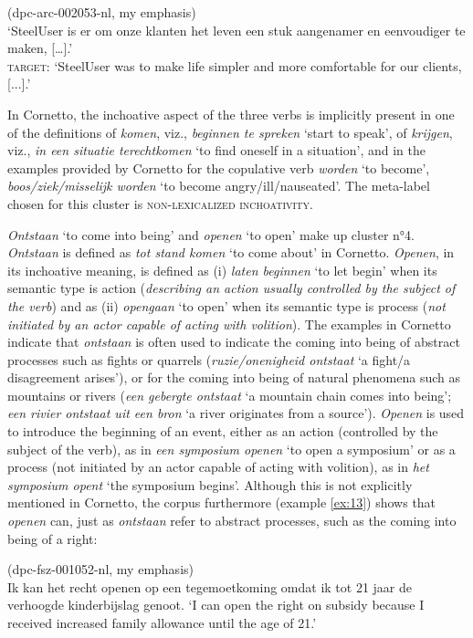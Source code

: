 \ea\label{ex:12}(dpc-arc-002053-nl, my emphasis)\\
`SteelUser is er  om onze klanten het leven een stuk aangenamer en eenvoudiger te maken, […].'\smallskip\\\relax
\textsc{target}: `SteelUser was  to make life simpler and more comfortable for our clients, [...].'
\z

In Cornetto, the inchoative aspect of the three verbs is implicitly present in one of the definitions of \textit{komen}, viz., \textit{beginnen te spreken} `start to speak', of \textit{krijgen}, viz., \textit{in een situatie terechtkomen} `to find oneself in a situation', and in the examples provided by Cornetto for the copulative verb \textit{worden} `to become', \textit{boos\slash ziek\slash misselijk worden} `to become angry\slash ill\slash nauseated'. The meta-label chosen for this cluster is \textsc{non-lexicalized inchoativity}.

\textit{Ontstaan} `to come into being' and \textit{openen} `to open' make up cluster n°4. \textit{Ontstaan} is defined as \textit{tot stand komen} `to come about' in Cornetto. \textit{Openen}, in its inchoative meaning, is defined as (i) \textit{laten beginnen} `to let begin' when its semantic type is action (\textit{describing an action usually controlled by the subject of the verb}) and as (ii) \textit{opengaan} `to open' when its semantic type is process (\textit{not initiated by an actor capable of acting with volition}). The examples in Cornetto indicate that \textit{ontstaan} is often used to indicate the coming into being of abstract processes such as fights or quarrels (\textit{ruzie\slash onenigheid ontstaat} `a fight\slash a disagreement arises'), or for the coming into being of natural phenomena such as mountains or rivers (\textit{een gebergte ontstaat} `a mountain chain comes into being'; \textit{een rivier ontstaat uit een bron} `a river originates from a source'). \textit{Openen} is used to introduce the beginning of an event, either as an action (controlled by the subject of the verb), as in \textit{een symposium openen} `to open a symposium' or as a process (not initiated by an actor capable of acting with volition), as in \textit{het symposium opent} `the symposium begins'. Although this is not explicitly mentioned in Cornetto, the corpus furthermore (example \ref{ex:13}) shows that \textit{openen} can, just as \textit{ontstaan} refer to abstract processes, such as the coming into being of a right:

\ea\label{ex:13}(dpc-fsz-001052-nl, my emphasis)\\
Ik kan het recht openen op een tegemoetkoming omdat ik tot 21 jaar de verhoogde kinderbijslag genoot.
\glt `I can open the right on subsidy because I received increased family allowance until the age of 21.'
\z

